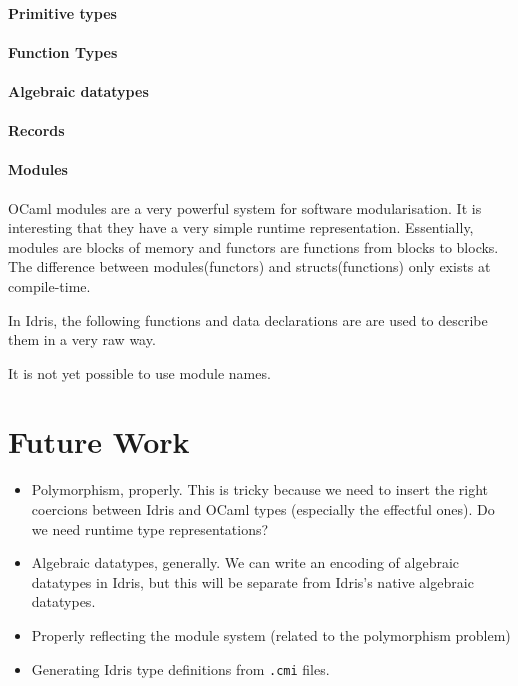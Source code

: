 \documentclass[a4paper,twocolumn]{article}
\begin{document}
\paragraph{Primitive types}



\paragraph{Function Types}

\paragraph{Algebraic datatypes}

\paragraph{Records}

\paragraph{Modules}
OCaml modules are a very powerful system for software modularisation. 
It is interesting that they have a very simple runtime representation.
Essentially,  modules are blocks of memory and functors are functions
from blocks to blocks. The difference between modules(functors) and
structs(functions) only exists at compile-time.

In Idris, the following functions and data declarations are are used to 
describe them in a very raw way.

It is not yet possible to use module names.

\section{Future Work}

\begin{itemize}
\item Polymorphism, properly. This is tricky because we need to insert
  the right coercions between Idris and OCaml types (especially the
  effectful ones). Do we need runtime type representations?
\item Algebraic datatypes, generally. We can write an encoding of
  algebraic datatypes in Idris, but this will be separate from Idris's
  native algebraic datatypes.
\item Properly reflecting the module system (related to the
  polymorphism problem)
\item Generating Idris type definitions from \texttt{.cmi} files.
\end{itemize}
\end{document}
